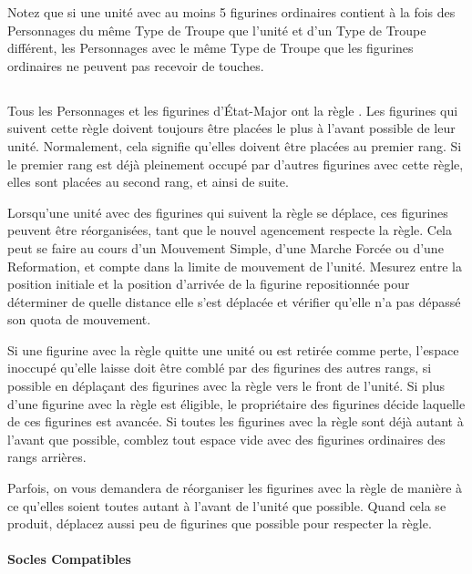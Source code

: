 Notez que si une unité avec au moins 5 figurines ordinaires contient à la fois des Personnages du même Type de Troupe que l'unité et d'un Type de Troupe différent, les Personnages avec le même Type de Troupe que les figurines ordinaires ne peuvent pas recevoir de touches.

\subsection{\newfromWHB{\frontrank}}
\label{front_rank}

Tous les Personnages et les figurines d'État-Major ont la règle \frontrank{}. Les figurines qui suivent cette règle doivent toujours être placées le plus à l'avant possible de leur unité. Normalement, cela signifie qu'elles doivent être placées au premier rang. Si le premier rang est déjà pleinement occupé par d'autres figurines avec cette règle, elles sont placées au second rang, et ainsi de suite.

Lorsqu'une unité avec des figurines qui suivent la règle \frontrank{} se déplace, ces figurines peuvent être réorganisées, tant que le nouvel agencement respecte la règle. Cela peut se faire au cours d'un Mouvement Simple, d'une Marche Forcée ou d'une Reformation, et compte dans la limite de mouvement de l'unité. Mesurez entre la position initiale et la position d'arrivée de la figurine repositionnée pour déterminer de quelle distance elle s'est déplacée et vérifier qu'elle n'a pas dépassé son quota de mouvement.

Si une figurine avec la règle \frontrank{} quitte une unité ou est retirée comme perte, l'espace inoccupé qu'elle laisse doit être comblé par des figurines des autres rangs, si possible en déplaçant des figurines avec la règle \frontrank{} vers le front de l'unité. Si plus d'une figurine avec la règle \frontrank{} est éligible, le propriétaire des figurines décide laquelle de ces figurines est avancée. Si toutes les figurines avec la règle \frontrank{} sont déjà autant à l'avant que possible, comblez tout espace vide avec des figurines ordinaires des rangs arrières.

Parfois, on vous demandera de réorganiser les figurines avec la règle \frontrank{} de manière à ce qu'elles soient toutes autant à l'avant de l'unité que possible. Quand cela se produit, déplacez aussi peu de figurines que possible pour respecter la règle.

\newpage
\paragraph{Socles Compatibles}

